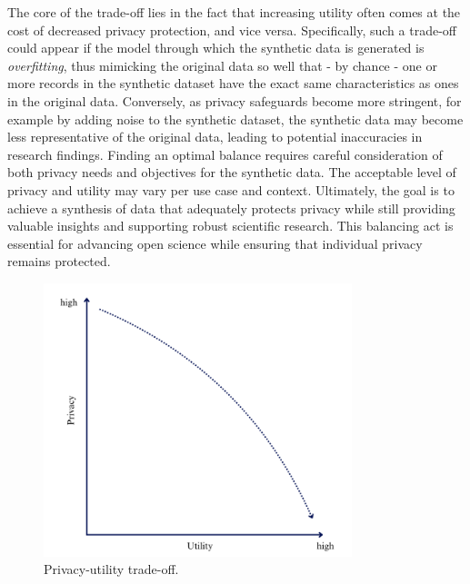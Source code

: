 The core of the trade-off lies in the fact that increasing utility often comes at the cost of decreased privacy protection, and vice versa. Specifically, such a trade-off could appear if the model through which the synthetic data is generated is \textit{overfitting}, thus mimicking the original data so well that - by chance - one or more records in the synthetic dataset have the exact same characteristics as ones in the original data. Conversely, as privacy safeguards become more stringent, for example by adding noise to the synthetic dataset, the synthetic data may become less representative of the original data, leading to potential inaccuracies in research findings. Finding an optimal balance requires careful consideration of both privacy needs and objectives for the synthetic data. The acceptable level of privacy and utility may vary per use case and context. Ultimately, the goal is to achieve a synthesis of data that adequately protects privacy while still providing valuable insights and supporting robust scientific research. This balancing act is essential for advancing open science while ensuring that individual privacy remains protected. 

\begin{figure}[H]
    \centering
    \includegraphics[width=0.8\textwidth]{Images/Screenshot 2024-08-06 at 13.06.13.png}
    \caption{Privacy-utility trade-off.}
    \label{fig:synthesis_1}
\end{figure}














